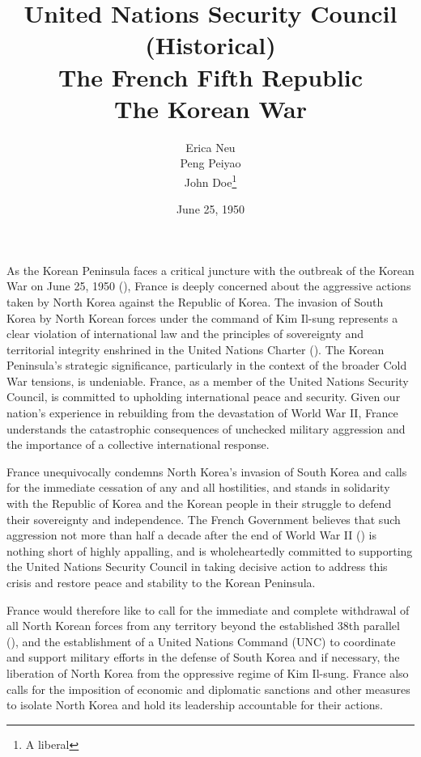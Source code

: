 \documentclass[a4paper,12pt]{article}
\title{
	\vspace{0.7in}
	United Nations Security Council (Historical)\\
	\vspace{1em}
	\textbf{The French Fifth Republic} \\
	\vspace{0.5em}
	\textbf{The Korean War}
	\vspace{4in}
}
\date{
	\vspace{0in}
	June 25, 1950
}
\author{
	Erica Neu\\ Peng Peiyao \\ John Doe\thanks{A liberal}
}
\begin{document}
\maketitle

\newpage


As the Korean Peninsula faces a critical juncture with the outbreak of the Korean War on June 25, 1950 (\cite{imperialwarmuseums_2024_a}), France is deeply concerned about the aggressive actions taken by North Korea against the Republic of Korea. The invasion of South Korea by North Korean forces under the command of Kim Il-sung represents a clear violation of international law and the principles of sovereignty and territorial integrity enshrined in the United Nations Charter (\cite{nations_2023_united}). The Korean Peninsula's strategic significance, particularly in the context of the broader Cold War tensions, is undeniable. France, as a member of the United Nations Security Council, is committed to upholding international peace and security. Given our nation's experience in rebuilding from the devastation of World War II, France understands the catastrophic consequences of unchecked military aggression and the importance of a collective international response.

France unequivocally condemns North Korea's invasion of South Korea and calls for the immediate cessation of any and all hostilities, and stands in solidarity with the Republic of Korea and the Korean people in their struggle to defend their sovereignty and independence. The French Government believes that such aggression not more than half a decade after the end of World War II (\cite{britannica_2024_world}) is nothing short of highly appalling, and is wholeheartedly committed to supporting the United Nations Security Council in taking decisive action to address this crisis and restore peace and stability to the Korean Peninsula.

France would therefore like to call for the immediate and complete withdrawal of all North Korean forces from any territory beyond the established 38th parallel (\cite{thenationalendowmentforthehumanities_2019_korea}), and the establishment of a United Nations Command (UNC) to coordinate and support military efforts in the defense of South Korea and if necessary, the liberation of North Korea from the oppressive regime of Kim Il-sung. France also calls for the imposition of economic and diplomatic sanctions and other measures to isolate North Korea and hold its leadership accountable for their actions.
\end{document}
